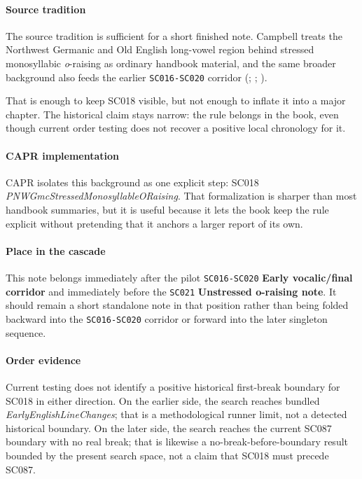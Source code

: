 \documentclass[
  british,
  a4paper,
]{article}
\begin{document}
\paragraph{Source tradition}\label{source-tradition-13}

The source tradition is sufficient for a short finished note. Campbell
treats the Northwest Germanic and Old English long-vowel region behind
stressed monosyllabic \emph{o}-raising as ordinary handbook material,
and the same broader background also feeds the earlier
\texttt{SC016-SC020} corridor (; ;
).

That is enough to keep SC018 visible, but not enough to inflate it into
a major chapter. The historical claim stays narrow: the rule belongs in
the book, even though current order testing does not recover a positive
local chronology for it.

\paragraph{CAPR implementation}\label{capr-implementation-13}

CAPR isolates this background as one explicit step: SC018
\emph{PNWGmcStressedMonosyllableORaising}. That formalization is sharper
than most handbook summaries, but it is useful because it lets the book
keep the rule explicit without pretending that it anchors a larger
report of its own.

\paragraph{Place in the cascade}\label{place-in-the-cascade-13}

This note belongs immediately after the pilot \texttt{SC016-SC020}
\textbf{Early vocalic/final corridor} and immediately before the
\texttt{SC021} \textbf{Unstressed o-raising note}. It should remain a
short standalone note in that position rather than being folded backward
into the \texttt{SC016-SC020} corridor or forward into the later
singleton sequence.

\paragraph{Order evidence}\label{order-evidence-13}

Current testing does not identify a positive historical first-break
boundary for SC018 in either direction. On the earlier side, the search
reaches bundled \emph{EarlyEnglishLineChanges}; that is a methodological
runner limit, not a detected historical boundary. On the later side, the
search reaches the current SC087 boundary with no real break; that is
likewise a no-break-before-boundary result bounded by the present search
space, not a claim that SC018 must precede SC087.
\end{document}
